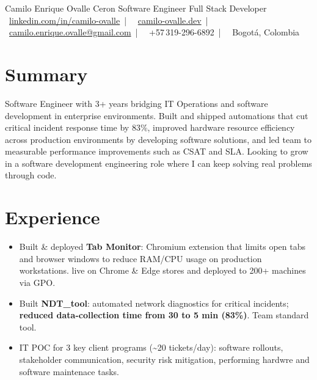 \documentclass[10pt]{article}
\begin{document}
\cvheader
  {Camilo Enrique Ovalle Ceron}
  {Software Engineer \textbar{} Full Stack Developer}
  {%
    \faLinkedin~\href{https://linkedin.com/in/camilo-ovalle}{linkedin.com/in/camilo-ovalle}~|~%
    \faGlobe~\href{https://camilo-ovalle.dev}{camilo-ovalle.dev}~|~%
    \faEnvelope~\href{mailto:camilo.enrique.ovalle@gmail.com}{camilo.enrique.ovalle@gmail.com}~|~%
    \faPhone~+57\,319-296-6892~|~%
    \faMapMarker*~Bogotá, Colombia%
  }

\section{Summary}

Software Engineer with 3+ years bridging IT Operations and software development in
enterprise environments. Built and shipped automations that cut critical incident response
time by 83\%, improved hardware resource efficiency across production environments by developing software solutions, and
led team to measurable performance improvements such as CSAT and SLA. Looking to grow in a software development engineering role where I can keep solving real problems through code.

\section{Experience}

\begin{itemize}
      \item Built \& deployed \textbf{Tab Monitor}: Chromium extension that limits open tabs and browser windows to reduce RAM/CPU usage on production workstations. live on Chrome \& Edge stores and deployed to 200+ machines via GPO.
      \item Built \textbf{NDT\_tool}: automated network diagnostics for critical incidents;
      \textbf{reduced data-collection time from 30 to 5 min (83\%)}. Team standard tool.
      \item IT POC for 3 key client programs (\textasciitilde20 tickets/day): software rollouts,
      stakeholder communication, security risk mitigation, performing hardwre and software maintenace tasks.
\end{itemize}
\end{document}

